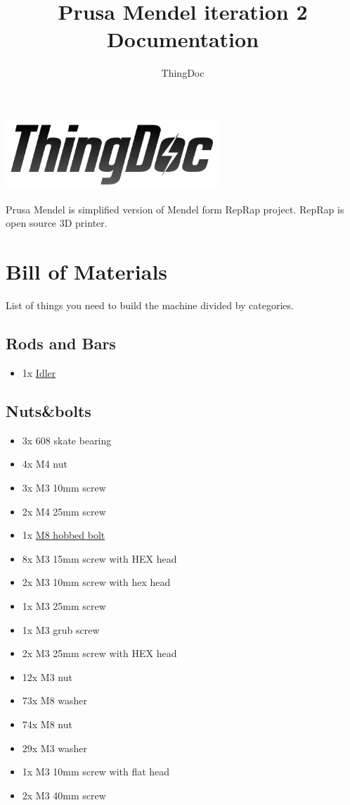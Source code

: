 \documentclass[11pt]{article}
\title{Prusa Mendel iteration 2 Documentation}
\author{ThingDoc}
\begin{document}
\maketitle
\begin{center}
\includegraphics[width=8cm]{logo.png}
\end{center}
Prusa Mendel is simplified version of Mendel form RepRap project. RepRap is open source 3D printer.

\newpage

\tableofcontents

\newpage

\section{Bill of Materials}
List of things you need to build the machine divided by categories.

\subsection{Rods and Bars}
\begin{itemize}
\item 1x \hyperlink{thing_idler-m8-piece}{Idler}
\end{itemize}

\subsection{Nuts\&bolts}
\begin{itemize}
\item 3x 608 skate bearing
\item 4x M4 nut
\item 3x M3 10mm screw
\item 2x M4 25mm screw
\item 1x \hyperlink{thing_hobbed-bolt}{M8 hobbed bolt}
\item 8x M3 15mm screw with HEX head
\item 2x M3 10mm screw with hex head
\item 1x M3 25mm screw
\item 1x M3 grub screw
\item 2x M3 25mm screw with HEX head
\item 12x M3 nut
\item 73x M8 washer
\item 74x M8 nut
\item 29x M3 washer
\item 1x M3 10mm screw with flat head
\item 2x M3 40mm screw
\end{itemize}
\end{document}
